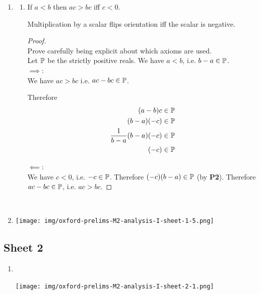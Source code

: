 \begin{enumerate}
\item
  \begin{enumerate}[label=(\alph*)]
  \item
    \newpage
    \begin{theorem*}
      If $a < b$ then $ac > bc$ iff $c < 0$.
    \end{theorem*}
    \begin{intuition*}
      Multiplication by a scalar flips orientation iff the scalar is negative.
    \end{intuition*}
    \begin{proof}~\\
       Prove carefully being explicit about which axioms are used.\\
      Let $\P$ be the strictly positive reals. We have $a < b$, i.e. $b - a \in \P$.\\
      $\implies$:\\
      We have $ac > bc$ i.e. $ac - bc \in \P$.

      Therefore
      \begin{align*}
        (a - b)c &\in \P\\
        (b - a)(-c) &\in \P\\
        \frac{1}{b-a}(b - a)(-c) &\in \P\\
        (-c) &\in \P
      \end{align*}

      $\impliedby$:\\
      We have $c < 0$, i.e. $-c \in \P$. Therefore $(-c)(b - a) \in \P$ (by {\bf P2}). Therefore
      $ac - bc \in \P$, i.e. $ac > bc$.
    \end{proof}
  \end{enumerate}~\\
\item

\begin{mdframed}
\texttt{[image: img/oxford-prelims-M2-analysis-I-sheet-1-5.png]}
\end{mdframed}
\end{enumerate}

\newpage
\subsection{Sheet 2}

\begin{enumerate}
\item~\\
  \begin{mdframed}
    \texttt{[image: img/oxford-prelims-M2-analysis-I-sheet-2-1.png]}
  \end{mdframed}
\end{enumerate}

